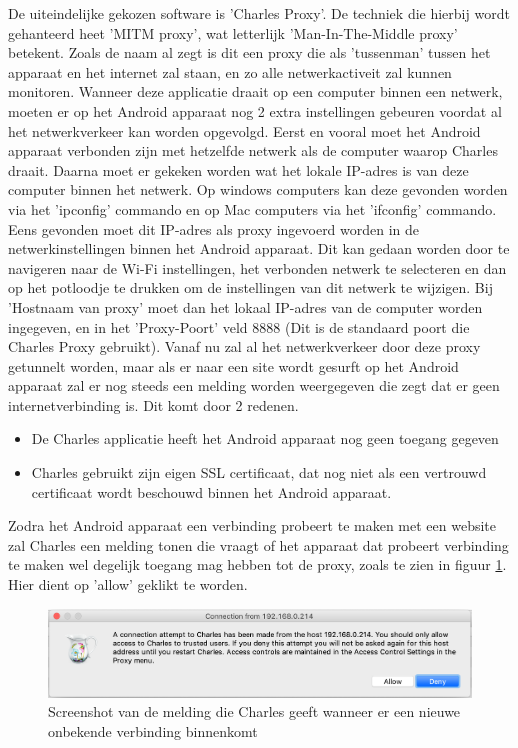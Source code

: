 De uiteindelijke gekozen software is 'Charles Proxy'. De techniek die hierbij wordt gehanteerd heet 'MITM proxy', wat letterlijk 'Man-In-The-Middle proxy' betekent. Zoals de naam al zegt is dit een proxy die als 'tussenman' tussen het apparaat en het internet zal staan, en zo alle netwerkactiveit zal kunnen monitoren. Wanneer deze applicatie draait op een computer binnen een netwerk, moeten er op het Android apparaat nog 2 extra instellingen gebeuren voordat al het netwerkverkeer kan worden opgevolgd. Eerst en vooral moet het Android apparaat verbonden zijn met hetzelfde netwerk als de computer waarop Charles draait. Daarna moet er gekeken worden wat het lokale IP-adres is van deze computer binnen het netwerk. Op windows computers kan deze gevonden worden via het 'ipconfig' commando en op Mac computers via het 'ifconfig' commando. Eens gevonden moet dit IP-adres als proxy ingevoerd worden in de netwerkinstellingen binnen het Android apparaat. Dit kan gedaan worden door te navigeren naar de Wi-Fi instellingen, het verbonden netwerk te selecteren en dan op het potloodje te drukken om de instellingen van dit netwerk te wijzigen. Bij 'Hostnaam van proxy' moet dan het lokaal IP-adres van de computer worden ingegeven, en in het 'Proxy-Poort' veld 8888 (Dit is de standaard poort die Charles Proxy gebruikt). Vanaf nu zal al het netwerkverkeer door deze proxy getunnelt worden, maar als er naar een site wordt gesurft op het Android apparaat zal er nog steeds een melding worden weergegeven die zegt dat er geen internetverbinding is. Dit komt door 2 redenen.

\begin{itemize}
    \item De Charles applicatie heeft het Android apparaat nog geen toegang gegeven
    \item Charles gebruikt zijn eigen SSL certificaat, dat nog niet als een vertrouwd certificaat wordt beschouwd binnen het Android apparaat.
\end{itemize}

Zodra het Android apparaat een verbinding probeert te maken met een website zal Charles een melding tonen die vraagt of het apparaat dat probeert verbinding te maken wel degelijk toegang mag hebben tot de proxy, zoals te zien in figuur \ref{fig:charlesmelding}. Hier dient op 'allow' geklikt te worden. 

\begin{figure}
    \centering
    \includegraphics[width=1\textwidth]{img/charlesmelding.png}
    \caption{Screenshot van de melding die Charles geeft wanneer er een nieuwe onbekende verbinding binnenkomt}
    \label{fig:charlesmelding}
\end{figure}

